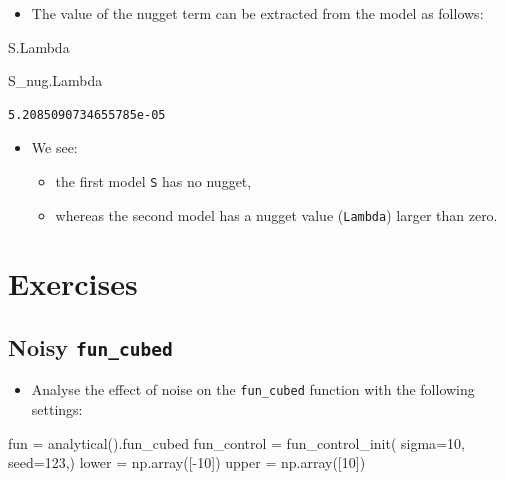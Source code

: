 \documentclass[
  letterpaper,
  DIV=11,
  numbers=noendperiod]{scrreprt}
\newenvironment{Shaded}{\begin{snugshade}}{\end{snugshade}}
\newcommand{\DecValTok}[1]{\textcolor[rgb]{0.68,0.00,0.00}{#1}}
\newcommand{\NormalTok}[1]{\textcolor[rgb]{0.00,0.23,0.31}{#1}}
\newcommand{\OperatorTok}[1]{\textcolor[rgb]{0.37,0.37,0.37}{#1}}
\providecommand{\tightlist}{%
  \setlength{\itemsep}{0pt}\setlength{\parskip}{0pt}}\usepackage{longtable,booktabs,array}
\begin{document}
\begin{itemize}
\tightlist
\item
  The value of the nugget term can be extracted from the model as
  follows:
\end{itemize}

\begin{Shaded}
\begin{Highlighting}[]
\NormalTok{S.Lambda}
\end{Highlighting}
\end{Shaded}

\begin{Shaded}
\begin{Highlighting}[]
\NormalTok{S\_nug.Lambda}
\end{Highlighting}
\end{Shaded}

\begin{verbatim}
5.2085090734655785e-05
\end{verbatim}

\begin{itemize}
\tightlist
\item
  We see:

  \begin{itemize}
  \tightlist
  \item
    the first model \texttt{S} has no nugget,
  \item
    whereas the second model has a nugget value (\texttt{Lambda}) larger
    than zero.
  \end{itemize}
\end{itemize}

\hypertarget{exercises-5}{%
\section{Exercises}\label{exercises-5}}

\hypertarget{noisy-fun_cubed}{%
\subsection{\texorpdfstring{Noisy
\texttt{fun\_cubed}}{Noisy fun\_cubed}}\label{noisy-fun_cubed}}

\begin{itemize}
\tightlist
\item
  Analyse the effect of noise on the \texttt{fun\_cubed} function with
  the following settings:
\end{itemize}

\begin{Shaded}
\begin{Highlighting}[]
\NormalTok{fun }\OperatorTok{=}\NormalTok{ analytical().fun\_cubed}
\NormalTok{fun\_control }\OperatorTok{=}\NormalTok{ fun\_control\_init(}
\NormalTok{    sigma}\OperatorTok{=}\DecValTok{10}\NormalTok{,}
\NormalTok{    seed}\OperatorTok{=}\DecValTok{123}\NormalTok{,)}
\NormalTok{lower }\OperatorTok{=}\NormalTok{ np.array([}\OperatorTok{{-}}\DecValTok{10}\NormalTok{])}
\NormalTok{upper }\OperatorTok{=}\NormalTok{ np.array([}\DecValTok{10}\NormalTok{])}
\end{Highlighting}
\end{Shaded}
\end{document}
